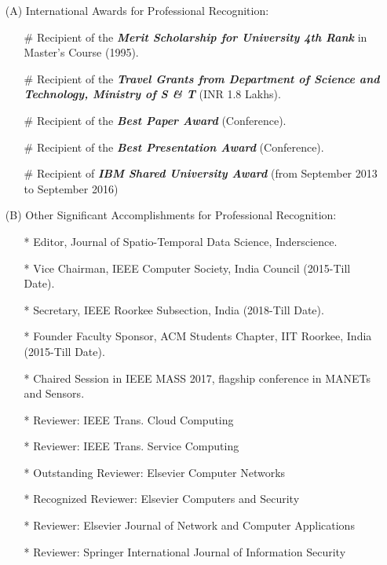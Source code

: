 \begin{itemize}
\item[(A)] International Awards for Professional Recognition:

\begin{itemize}
	\item[\#]
	Recipient of the \emph{\textbf{Merit Scholarship for University 4th Rank}}
	in Master's Course (1995).
	
	\item[\#]
	Recipient of the \emph{\textbf{Travel Grants from Department of Science and Technology, Ministry of S \& T}}
	(INR 1.8 Lakhs).
	
	\item[\#]
	Recipient of the \emph{\textbf{Best Paper Award}} (Conference).
	
	\item[\#]
	Recipient of the \emph{\textbf{Best Presentation Award}} (Conference).

	\item[\#]
	Recipient of \textbf{\textit{IBM Shared University Award}} (from September 2013 to September 2016)
\end{itemize}

\item[(B)] Other Significant Accomplishments for Professional Recognition: 

\begin{itemize}
	\item[*] Editor, Journal of Spatio-Temporal Data Science, Inderscience.

	\item[*] Vice Chairman, IEEE Computer Society, India Council (2015-Till Date).

	\item[*] Secretary, IEEE Roorkee Subsection, India (2018-Till Date).

	\item[*] Founder Faculty Sponsor, ACM Students Chapter, IIT Roorkee, India (2015-Till Date).
	
	\item[*] Chaired Session in IEEE MASS 2017, flagship conference in MANETs and Sensors.
		
	\item[*] Reviewer: IEEE Trans. Cloud Computing
	
	\item[*] Reviewer: IEEE Trans. Service Computing
	
	\item[*] Outstanding Reviewer: Elsevier Computer Networks

	\item[*] Recognized Reviewer: Elsevier Computers and Security

	\item[*] Reviewer: Elsevier Journal of Network and Computer Applications
	
	\item[*] Reviewer: Springer International Journal of Information Security
	
	
	\end{itemize}
		\end{itemize}
